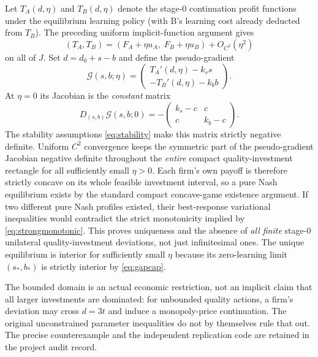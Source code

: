 \documentclass[11pt,a4paper]{article}
\numberwithin{equation}{section}
\theoremstyle{remark}
\begin{document}
Let $T_A(d,\eta)$ and $T_B(d,\eta)$ denote the stage-0
continuation profit functions under the equilibrium learning policy
(with B's learning cost already deducted from $T_B$).
The preceding uniform implicit-function argument gives
\[
(T_A,T_B)=
(F_A+\eta u_A,\;F_B+\eta u_B)+O_{C^2}(\eta^2)
\]
on all of $J$. Set $d=d_0+s-b$ and define the pseudo-gradient
\[
\mathcal G(s,b;\eta)=
\begin{pmatrix}
T_A'(d,\eta)-k_s s\\
-T_B'(d,\eta)-k_b b
\end{pmatrix}.
\]
At $\eta=0$ its Jacobian is the \emph{constant} matrix
\begin{equation}
 D_{(s,b)}\mathcal G(s,b;0)
=-\begin{pmatrix}
 k_s-c&c\\ c&k_b-c
\end{pmatrix}.
 \label{eq:strongmonotonic}
\end{equation}
The stability assumptions \eqref{eq:stability} make this matrix
strictly negative definite. Uniform $C^2$ convergence keeps the
symmetric part of the pseudo-gradient Jacobian negative definite
throughout the \emph{entire} compact quality-investment rectangle for
all sufficiently small $\eta>0$.
Each firm's own payoff is therefore strictly concave on its whole
feasible investment interval, so a pure Nash equilibrium exists by
the standard compact concave-game existence argument.
If two different pure Nash profiles existed, their best-response
variational inequalities would contradict the strict monotonicity
implied by \eqref{eq:strongmonotonic}.
This proves uniqueness and the absence of \emph{all finite}
stage-0 unilateral quality-investment deviations, not just infinitesimal
ones. The unique equilibrium is interior for sufficiently small $\eta$
because its zero-learning limit $(s_*,b_*)$ is strictly interior by
\eqref{eq:gapcap}.

The bounded domain is an actual economic restriction, not an implicit
claim that all larger investments are dominated: for unbounded quality
actions, a firm's deviation may cross $d=3t$ and induce a
monopoly-price continuation. The original unconstrained
parameter inequalities do not by themselves rule that out.
The precise counterexample and the independent replication code
are retained in the project audit record.
\end{document}
